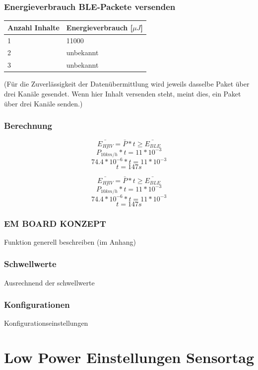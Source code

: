 \subsubsection*{Energieverbrauch BLE-Packete versenden}
 
\begin{tabular}{|l|l|}\hline \label{Energie_Pakete_Werte} 
    Anzahl Inhalte  & Energieverbrauch [$\mu J$] \\ \hline
    1 & 11000 \\ \hline
    2 & unbekannt \\ \hline
    3 & unbekannt \\ \hline
\end{tabular}

(Für die Zuverlässigkeit der Datenübermittlung wird jeweils dasselbe Paket über drei Kanäle gesendet. Wenn hier  Inhalt versenden \grqq  steht, meint dies, ein Paket über drei Kanäle senden.)

\subsubsection*{Berechnung}

\[\bar{E_{HRV}} = \bar{P} * t \ge \bar{E_{BLE}}  \]
\[\bar{P_{10km/h}} * t = 11 * 10^{-3}  \]
\[74.4 * 10^{-6} * t = 11 * 10^{-3}   \]
\[t = 147 s  \]

\[\bar{E_{HRV}} = \bar{P} * t \ge \bar{E_{BLE}}  \]
\[\bar{P_{10km/h}} * t = 11 * 10^{-3}  \]
\[74.4 * 10^{-6} * t = 11 * 10^{-3}   \]
\[t = 147 s  \]

\subsubsection*{EM BOARD KONZEPT}
Funktion generell beschreiben (im Anhang) 
\subsubsection*{Schwellwerte}
Ausrechnend der schwellwerte
\subsubsection*{Konfigurationen}
Konfigurationseinstellungen



\section{Low Power Einstellungen Sensortag}

